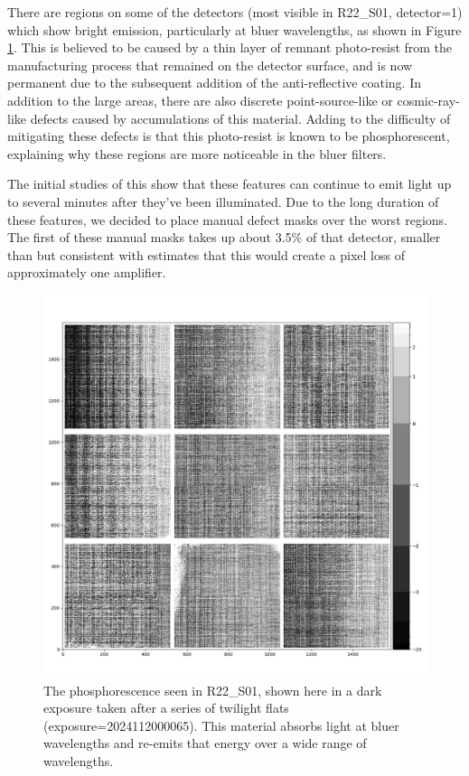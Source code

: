 There are regions on some of the detectors (most visible in R22\_S01, detector=1) which show bright emission, particularly at bluer wavelengths, as shown in Figure \ref{fig:isr_phosphorescence_example}.
This is believed to be caused by a thin layer of remnant photo-resist from the manufacturing process that remained on the detector surface, and is now permanent due to the subsequent addition of the anti-reflective coating.
In addition to the large areas, there are also discrete point-source-like or cosmic-ray-like defects caused by accumulations of this material.
Adding to the difficulty of mitigating these defects is that this photo-resist is known to be phosphorescent, explaining why these regions are more noticeable in the bluer filters.

The initial studies of this show that these features can continue to emit light up to several minutes after they've been illuminated.
Due to the long duration of these features, we decided to place manual defect masks over the worst regions.
The first of these manual masks takes up about 3.5\% of that detector, smaller than but consistent with estimates that this would create a pixel loss of approximately one amplifier.

\begin{figure}
  \begin{center}
  \includegraphics[width=\textwidth]{figures/isr-f01-phosphor_dark_exposure.jpg}
  \caption{The phosphorescence seen in R22\_S01, shown here in a dark exposure taken after a series of twilight flats (exposure=2024112000065).  This material absorbs light at bluer wavelengths and re-emits that energy over a wide range of wavelengths.}
  \label{fig:isr_phosphorescence_example}
  \end{center}
\end{figure}

